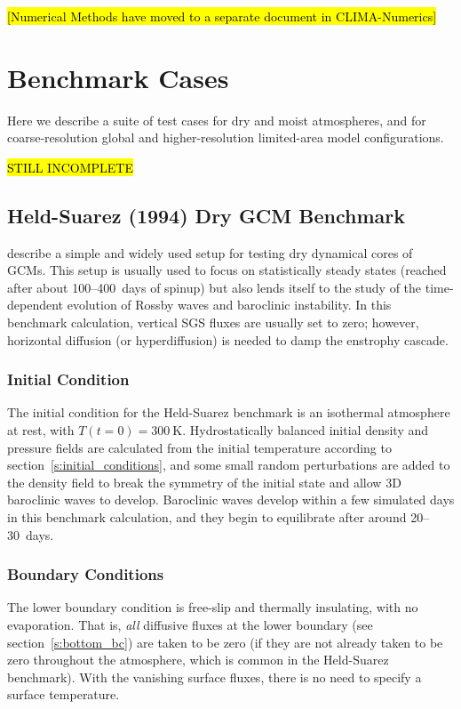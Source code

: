 \documentclass{report}
\begin{document}
\hl{[Numerical Methods have moved to a separate document in CLIMA-Numerics]}

\chapter{Benchmark Cases}

Here we describe a suite of test cases for dry and moist atmospheres, and for coarse-resolution global and higher-resolution limited-area model configurations. 

\hl{STILL INCOMPLETE}

\section{Held-Suarez (1994) Dry GCM Benchmark}

\citet{Held94} describe a simple and widely used setup for testing dry dynamical cores of GCMs. This setup is usually used to focus on statistically steady states (reached after about 100--400~days of spinup) but also lends itself to the study of the time-dependent evolution of Rossby waves and baroclinic instability. In this benchmark calculation, vertical SGS fluxes are usually set to zero; however, horizontal diffusion (or hyperdiffusion) is needed to damp the enstrophy cascade. 

\subsection{Initial Condition}

The initial condition for the Held-Suarez benchmark is an isothermal atmosphere at rest, with $T(t=0) = 300~\mathrm{K}$. Hydrostatically balanced initial density and pressure fields are calculated from the initial temperature according to section~\ref{s:initial_conditions}, and some small random perturbations are added to the density field to break the symmetry of the initial state and allow 3D baroclinic waves to develop. Baroclinic waves develop within a few simulated days in this benchmark calculation, and they begin to equilibrate after around 20--30~days. 

\subsection{Boundary Conditions}

The lower boundary condition is free-slip and thermally insulating, with no evaporation. That is, \emph{all} diffusive fluxes at the lower boundary (see section~\ref{s:bottom_bc}) are taken to be zero (if they are not already taken to be zero throughout the atmosphere, which is common in the Held-Suarez benchmark). With the vanishing surface fluxes, there is no need to specify a surface temperature.
\end{document}
